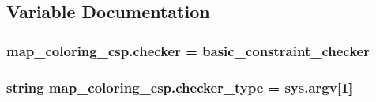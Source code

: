 \subsection{Variable Documentation}
\hypertarget{namespacemap__coloring__csp_a5d2e6413b3aed18b7d14fa6dca9efd76}{}
\subsubsection[{checker}]{\setlength{\rightskip}{0pt plus 5cm}map\+\_\+coloring\+\_\+csp.\+checker = basic\+\_\+constraint\+\_\+checker}\label{namespacemap__coloring__csp_a5d2e6413b3aed18b7d14fa6dca9efd76}
\hypertarget{namespacemap__coloring__csp_aaf9918962a7c6eac29c37abcc4f2545b}{}
\subsubsection[{checker\+\_\+type}]{\setlength{\rightskip}{0pt plus 5cm}string map\+\_\+coloring\+\_\+csp.\+checker\+\_\+type = sys.\+argv\mbox{[}1\mbox{]}}\label{namespacemap__coloring__csp_aaf9918962a7c6eac29c37abcc4f2545b}
